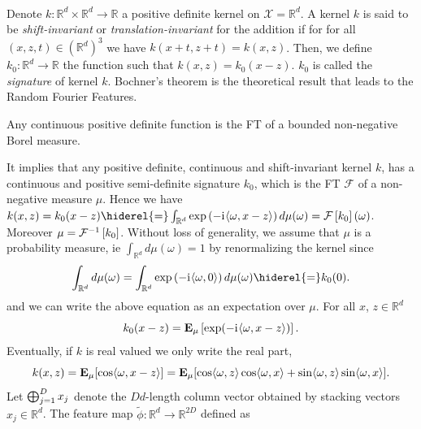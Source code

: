 \paragraph{}
Denote $k: \mathbb{R}^d \times \mathbb{R}^d \to \mathbb{R}$ a positive
definite kernel on $\mathcal{X}=\mathbb{R}^d$. A kernel $k$ is said to be
\emph{shift-invariant} or \emph{translation-invariant} for the addition if for
for all $(x,z,t) \in \left(\mathbb{R}^d\right)^3$ we have $k(x+t,z+t) =
k(x,z)$.  Then, we define $k_0: \mathbb{R}^d \to \mathbb{R}$ the function such
that $k(x,z)= k_0(x-z)$. $k_0$ is called the \emph{signature} of kernel $k$.
Bochner's theorem \citep{folland1994course} is the theoretical result that
leads to the Random Fourier Features.
\begin{theorem}\label{th:bochner-scalar}
    Any continuous positive definite function is the \acl{FT} of a
    bounded non-negative Borel measure.
\end{theorem}
It implies that any positive definite, continuous and shift-invariant kernel
$k$, has a continuous and positive semi-definite signature $k_0$, which is the
\acl{FT} $\mathcal{F}$ of a non-negative measure $\mu$. Hence we have
$k(x,z)=k_0(x-z) \hiderel{=} \int_{\mathbb{R}^d} \exp\left(-\iu \inner{\omega,x
- z}\right) d\mu(\omega) =\FT{k_0}(\omega)$.  Moreover $\mu = \mathcal{F}^{-1}\left[k_0\right]$.
Without loss of generality, we assume that $\mu$ is a probability measure,
\acs{ie} $\int_{\mathbb{R}^d} d\mu(\omega)=1$ by renormalizing the kernel since
\begin{dmath*}
    \int_{\mathbb{R}^d}d\mu(\omega)= \int_{\mathbb{R}^d}\exp\left(-\iu
    \inner{\omega, 0}\right)d\mu(\omega)\hiderel{=}k_0(0).
\end{dmath*}
and we can write the above equation as an expectation over $\mu$. For all
$x$,
$z\in\mathbb{R}^d$
\begin{dmath*}
    k_0(x-z) = \expectation_{\mu}\left[\exp(-\iu \inner{\omega,x - z})\right].
\end{dmath*}
Eventually, if $k$ is real valued we only write the real part,
\begin{dmath*}
    k(x,z) = \expectation_{\mu}[\cos \inner{\omega,x - z}] =
    \expectation_{\mu}[ \cos \inner{\omega,z} \cos \inner{\omega,x} + \sin
    \inner{\omega,z} \sin \inner{\omega,x}].
\end{dmath*}
Let $\operatorname*{\bigoplus}_{j=1}^D x_j$ denote the $Dd$-length column
vector obtained by stacking vectors $x_j \in \mathbb{R}^d$.  The feature map
$\widetilde{\phi}: \mathbb{R}^d \rightarrow \mathbb{R}^{2D}$ defined as
